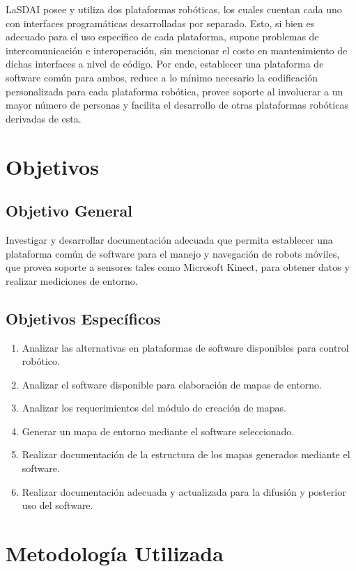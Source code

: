 LaSDAI posee y utiliza dos plataformas robóticas, los cuales cuentan cada uno con interfaces programáticas desarrolladas por separado. Esto, si bien es adecuado para el uso específico de cada plataforma, supone problemas de intercomunicación e interoperación, sin mencionar el costo en mantenimiento de dichas interfaces a nivel de código. Por ende, establecer una plataforma de software común para ambos, reduce a lo mínimo necesario la codificación personalizada para cada plataforma robótica, provee soporte al involucrar a un mayor número de personas y facilita el desarrollo de otras plataformas robóticas derivadas de esta.

\section{Objetivos}

\subsection{Objetivo General}

Investigar y desarrollar documentación adecuada que permita establecer una plataforma común de software para el manejo y navegación de robots móviles, que provea soporte a sensores tales como Microsoft Kinect, para obtener datos y realizar mediciones de entorno.

\subsection{Objetivos Específicos}

\begin{enumerate}
	\itemsep1pt \parskip1pt 
	\item Analizar las alternativas en plataformas de software disponibles para control robótico.
	\item Analizar el software disponible para elaboración de mapas de entorno.
	\item Analizar los requerimientos del módulo de creación de mapas.
	\item Generar un mapa de entorno mediante el software seleccionado.
	\item Realizar documentación de la estructura de los mapas generados mediante el software.
	\item Realizar documentación adecuada y actualizada para la difusión y posterior uso del software.
\end{enumerate}

\section{Metodología Utilizada}


